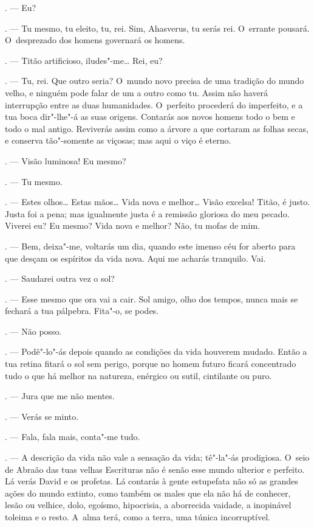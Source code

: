 \begin{linenumbers}
\begin{Parskip}
. --- Eu?

. --- Tu mesmo, tu eleito, tu, rei. Sim, Ahasverus, tu serás rei.
O~errante pousará. O~desprezado dos homens governará os homens.

. --- Titão artificioso, iludes"-me\ldots{} Rei, eu?

. --- Tu, rei. Que outro seria? O~mundo novo precisa de uma
tradição do mundo velho, e ninguém pode falar de um a outro como tu.
Assim não haverá interrupção entre as duas humanidades. O~perfeito
procederá do imperfeito, e a tua boca dir"-lhe"-á as suas origens.
Contarás aos novos homens todo o bem e todo o mal antigo. Reviverás
assim como a árvore a que cortaram as folhas secas, e conserva
tão"-somente as viçosas; mas aqui o viço é eterno.

. --- Visão luminosa! Eu mesmo?

. --- Tu mesmo.

. --- Estes olhos\ldots{} Estas mãos\ldots{} Vida nova e melhor\ldots{} Visão
excelsa! Titão, é justo. Justa foi a pena; mas igualmente justa é a
remissão gloriosa do meu pecado. Viverei eu? Eu mesmo? Vida nova e
melhor? Não, tu mofas de mim.

. --- Bem, deixa"-me, voltarás um dia, quando este imenso céu for
aberto para que desçam os espíritos da vida nova. Aqui me acharás
tranquilo. Vai.

. --- Saudarei outra vez o sol?

. --- Esse mesmo que ora vai a cair. Sol amigo, olho dos tempos,
nunca mais se fechará a tua pálpebra. Fita"-o, se podes.

. --- Não posso.

. --- Podê"-lo"-ás depois quando as condições da vida houverem
mudado. Então a tua retina fitará o sol sem perigo, porque no homem
futuro ficará concentrado tudo o que há melhor na natureza, enérgico ou
sutil, cintilante ou puro.

. --- Jura que me não mentes.

. --- Verás se minto.

. --- Fala, fala mais, conta"-me tudo.

. --- A descrição da vida não vale a sensação da vida; tê"-la"-ás
prodigiosa. O~seio de Abraão das tuas velhas Escrituras não é senão esse
mundo ulterior e perfeito. Lá verás David e os profetas. Lá contarás à
gente estupefata não só as grandes ações do mundo extinto, como também
os males que ela não há de conhecer, lesão ou velhice, dolo, egoísmo,
hipocrisia, a aborrecida vaidade, a inopinável toleima e o resto. A~alma
terá, como a terra, uma túnica incorruptível.


\end{Parskip}
\end{linenumbers}
